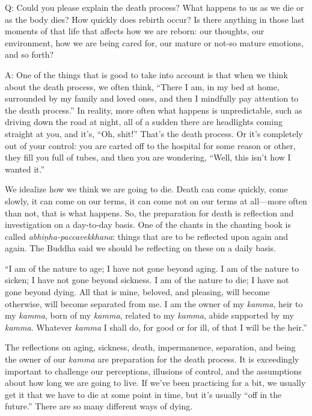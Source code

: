\qaspace
Q: Could you please explain the death process? What happens to us as we
die or as the body dies? How quickly does rebirth occur? Is there
anything in those last moments of that life that affects how we are
reborn: our thoughts, our environment, how we are being cared for, our
mature or not-so mature emotions, and so forth?

\qaspace
A: One of the things that is good to take into account is that when we
think about the death process, we often think, “There I am, in my bed at
home, surrounded by my family and loved ones, and then I mindfully pay
attention to the death process.” In reality, more often what happens is
unpredictable, such as driving down the road at night, all of a sudden
there are headlights coming straight at you, and it’s, “Oh, shit!”
That’s the death process. Or it’s completely out of your control: you
are carted off to the hospital for some reason or other, they fill you
full of tubes, and then you are wondering, “Well, this isn’t how I
wanted it.”

We idealize how we think we are going to die. Death can come quickly,
come slowly, it can come on our terms, it can come not on our terms at
all—more often than not, that is what happens. So, the preparation for
death is reflection and investigation on a day-to-day basis. One of the
chants in the chanting book is called \emph{abhiṇha-paccavekkhana}:
things that are to be reflected upon again and again. The Buddha said we
should be reflecting on these on a daily basis.

“I am of the nature to age; I have not gone beyond aging. I am of the
nature to sicken; I have not gone beyond sickness. I am of the nature to
die; I have not gone beyond dying. All that is mine, beloved, and
pleasing, will become otherwise, will become separated from me. I am the
owner of my \emph{kamma}, heir to my \emph{kamma}, born of my
\emph{kamma}, related to my \emph{kamma}, abide supported by my
\emph{kamma}. Whatever \emph{kamma} I shall do, for good or for ill, of
that I will be the heir.”

The reflections on aging, sickness, death, impermanence, separation, and
being the owner of our \emph{kamma} are preparation for the death
process. It is exceedingly important to challenge our perceptions,
illusions of control, and the assumptions about how long we are going to
live. If we’ve been practicing for a bit, we usually get it that we have
to die at some point in time, but it’s usually “off in the future.”
There are so many different ways of dying.

